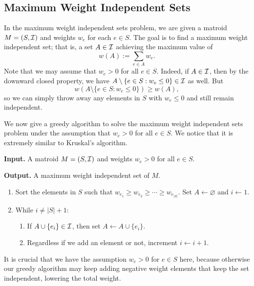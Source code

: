 \subsection{Maximum Weight Independent Sets} \label{subsec:4.2}
In the maximum weight independent sets problem, we are given a matroid 
$M = (S, {\cal I})$ and weights $w_e$ for each $e \in S$. The goal 
is to find a maximum weight independent set; that is, a set $A \in {\cal I}$ 
achieving the maximum value of 
\[ w(A) := \sum_{e\in A} w_e. \]
Note that we may assume that $w_e > 0$ for all $e \in S$. Indeed, if 
$A \in {\cal I}$, then by the downward closed property, we have 
$A \setminus \{e \in S : w_e \leq 0\} \in {\cal I}$ as well. But 
\[ w(A \setminus \{e \in S : w_e \leq 0\}) \geq w(A), \] 
so we can simply throw away any elements in $S$ with $w_e \leq 0$ 
and still remain independent.

We now give a greedy algorithm to solve the maximum weight independent 
sets problem under the assumption that $w_e > 0$ for all $e \in S$. 
We notice that it is extremely similar to Kruskal's algorithm.

\begin{mdframed}[
    linewidth=1pt,
    linecolor=black,
    bottomline=false,topline=false,rightline=false,
    innerrightmargin=0pt,innertopmargin=0pt,innerbottommargin=0pt,
    innerleftmargin=1em,%
    skipabove=0.75\baselineskip
]
{\bf Input.} A matroid $M = (S, {\cal I})$ and weights $w_e > 0$ for all 
$e \in S$.

{\bf Output.} A maximum weight independent set of $M$.
\begin{enumerate}[leftmargin=1.75cm, label={Step \arabic*.}]
    \item Sort the elements in $S$ such that 
    $w_{e_1} \geq w_{e_2} \geq \cdots \geq w_{e_{|S|}}$. 
    Set $A \gets \varnothing$ and $i \gets 1$. 

    \item While $i \neq |S|+1$:
    \begin{enumerate}[label={}]
        \item If $A \cup \{e_i\} \in {\cal I}$, then set $A \gets A \cup \{e_i\}$.
        \item Regardless if we add an element or not, increment $i \gets i+1$.
    \end{enumerate}
\end{enumerate}
\end{mdframed}\vspace{-0.15cm}
It is crucial that we have the assumption $w_e > 0$ for $e \in S$ here, 
because otherwise our greedy algorithm may keep adding negative weight 
elements that keep the set independent, lowering the total weight.

